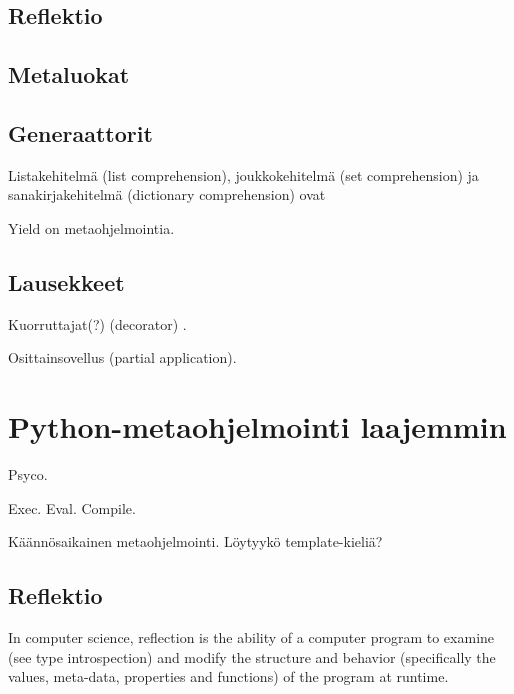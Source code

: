 \documentclass[finnish]{tktltiki2}
\theoremstyle{definition}
\theoremstyle{remark}
\begin{document}
\subsection{Reflektio}

\cite{dive-into-python}

\subsection{Metaluokat}

\subsection{Generaattorit}

Listakehitelmä (list comprehension), joukkokehitelmä (set comprehension) ja sanakirjakehitelmä (dictionary comprehension) ovat

Yield on metaohjelmointia.

\subsection{Lausekkeet}

Kuorruttajat(?) (decorator) \cite{dubois2005nest}.

Osittainsovellus (partial application).



\section{Python-metaohjelmointi laajemmin}

Psyco.

Exec. Eval. Compile.

Käännösaikainen metaohjelmointi. Löytyykö template-kieliä?

\subsection{Reflektio}

In computer science, reflection is the ability of a computer program to examine (see type introspection) and modify the structure and behavior (specifically the values, meta-data, properties and functions) of the program at runtime.
\end{document}
